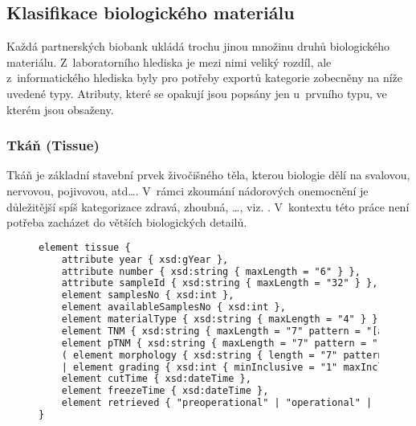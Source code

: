 \subsection{Klasifikace biologického materiálu}
Každá partnerských biobank ukládá trochu jinou množinu druhů biologického materiálu. Z~laboratorního hlediska je mezi nimi veliký rozdíl, ale z~informatického hlediska byly pro potřeby exportů kategorie zobecněny na níže uvedené typy. Atributy, které se opakují jsou popsány jen u~prvního typu, ve kterém jsou obsaženy.

\subsubsection{Tkáň (Tissue)}
Tkáň je základní stavební prvek živočišného těla, kterou biologie dělí na svalovou, nervovou, pojivovou, atd\ldots. V~rámci zkoumání nádorových onemocnění je důležitější spíš kategorizace zdravá, zhoubná, \ldots, viz. .
V~kontextu této práce není potřeba zacházet do větších biologických detailů.


\begin{figure}[hbtp]
\begin{center}
\begin{lstlisting}[language=XML, caption={Element popisující tkáň v~exportním schéma.}]
element tissue {
	attribute year { xsd:gYear },
	attribute number { xsd:string { maxLength = "6" } },
	attribute sampleId { xsd:string { maxLength = "32" } },
	element samplesNo { xsd:int },
	element availableSamplesNo { xsd:int },
	element materialType { xsd:string { maxLength = "4" } }
	element TNM { xsd:string { maxLength = "7" pattern = "[a-zA-Z0-9]+" } },
	element pTNM { xsd:string { maxLength = "7" pattern = "[a-zA-Z0-9]+" } },
	( element morphology { xsd:string { length = "7" pattern = "[0-9]{4}/[0-9]{2}"} } 
	| element grading { xsd:int { minInclusive = "1" maxInclusive = "9" } } ),
	element cutTime { xsd:dateTime },
	element freezeTime { xsd:dateTime },
	element retrieved { "preoperational" | "operational" | "post" | "unknown" }
}
\end{lstlisting}
\end{center}
\label{fig:export:data:tissue}
\end{figure}

